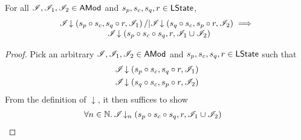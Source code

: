 \begin{lemma}\label{lem:merge-closure}
For all $\mathscr{I}, \mathscr{I}_1, \mathscr{I}_2 \in \textsf{AMod}$ and $s_p, s_c, s_q, r \in \textsf{LState}$,
%
\[
\begin{array}{l}
	\mathscr{I} \!\downarrow \left(s_p \circ s_c, s_q \circ r, \mathscr{I}_{1}\right) /| \mathscr{I} \!\downarrow \left(s_q \circ s_c, s_p \circ r, \mathscr{I}_{2}\right)
	\implies\\
	\hspace*{2cm} \mathscr{I} \!\downarrow \left(s_p \circ s_c \circ s_q, r, \mathscr{I}_{1} \cup \mathscr{I}_{2}\right)
\end{array}
\]
%
\begin{proof} Pick an arbitrary $\mathscr{I}, \mathscr{I}_1, \mathscr{I}_2 \in \textsf{AMod}$ and $s_p, s_c, s_q, r \in \textsf{LState}$ such that 
%
\begin{align}
	\mathscr{I} \!\downarrow \left(s_p \circ s_c, s_q \circ r, \mathscr{I}_{1}\right) \label{MC:Ass1}\\
	\mathscr{I} \!\downarrow \left(s_q \circ s_c, s_p \circ r, \mathscr{I}_{2}\right) \label{MC:Ass2}
\end{align} 
%
From the definition of $\downarrow$, it then suffices to show
%
\begin{align}
	& \forall n \in \mathbb{N}.\,  \mathscr{I} \!\downarrow_{n} \left(s_p \circ s_c \circ s_q, r, \mathscr{I}_{1} \cup \mathscr{I}_{2}\right) \label{MC:Goal2}
\end{align}
%


\end{proof}
\end{lemma}
